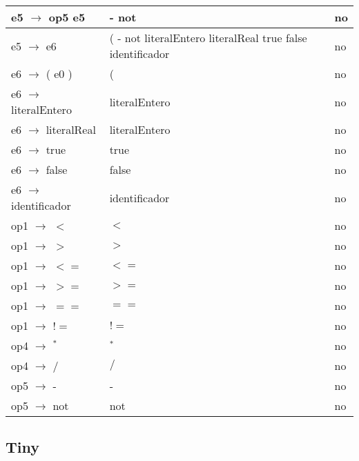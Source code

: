 \documentclass[11pt]{article}
\begin{document}
\begin{longtable}{|p{6cm}|p{4cm}|p{3cm}|}
                \hline
                e5 $\rightarrow$ op5 e5 & - not & no \\
                \hline
                e5 $\rightarrow$ e6 & ( - not literalEntero literalReal true false identificador & no \\
                \hline
                e6 $\rightarrow$ ( e0 ) & ( & no \\
                \hline
                e6 $\rightarrow$ literalEntero & literalEntero & no \\
                \hline
                e6 $\rightarrow$ literalReal & literalEntero & no \\
                \hline
                e6 $\rightarrow$ true & true & no \\
                \hline
                e6 $\rightarrow$ false & false & no \\
                \hline
                e6 $\rightarrow$ identificador & identificador & no \\
                \hline
                op1 $\rightarrow$ $<$ & $<$ & no \\
                \hline
                op1 $\rightarrow$ $>$ & $>$ & no \\
                \hline
                op1 $\rightarrow$ $<=$ & $<=$ & no \\
                \hline
                op1 $\rightarrow$ $>=$ & $>=$ & no \\
                \hline
                op1 $\rightarrow$ $==$ & $==$ & no \\
                \hline
                op1 $\rightarrow$ $!=$ & $!=$ & no \\
                \hline
                op4 $\rightarrow$ $^{\ast}$ & $^{\ast}$ & no \\
                \hline
                op4 $\rightarrow$ $/$ & $/$ & no \\
                \hline
                op5 $\rightarrow$ - & - & no \\
                \hline
                op5 $\rightarrow$ not & not & no \\
                \hline
            \end{longtable}
        \subsection{Tiny}
\end{document}
